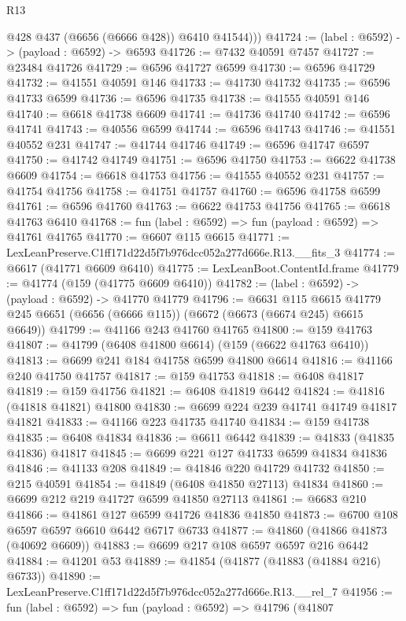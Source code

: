 \begin{lexlean}{R13}
\begin{coremodule}
          @428
          @437
          (@6656 (@6666 @428))
          @6410
          @41544)))
@41724 := (label : @6592) -> (payload : @6592) -> @6593
@41726 := @7432 @40591 @7457
@41727 := @23484 @41726
@41729 := @6596 @41727 @6599
@41730 := @6596 @41729
@41732 := @41551 @40591 @146
@41733 := @41730 @41732
@41735 := @6596 @41733 @6599
@41736 := @6596 @41735
@41738 := @41555 @40591 @146
@41740 := @6618 @41738 @6609
@41741 := @41736 @41740
@41742 := @6596 @41741
@41743 := @40556 @6599
@41744 := @6596 @41743
@41746 := @41551 @40552 @231
@41747 := @41744 @41746
@41749 := @6596 @41747 @6597
@41750 := @41742 @41749
@41751 := @6596 @41750
@41753 := @6622 @41738 @6609
@41754 := @6618 @41753
@41756 := @41555 @40552 @231
@41757 := @41754 @41756
@41758 := @41751 @41757
@41760 := @6596 @41758 @6599
@41761 := @6596 @41760
@41763 := @6622 @41753 @41756
@41765 := @6618 @41763 @6410
@41768 := fun (label : @6592) => fun (payload : @6592) => @41761 @41765
@41770 := @6607 @115 @6615
@41771 := LexLeanPreserve.C1ff171d22d5f7b976dcc052a277d666e.R13.__fits_3
@41774 := @6617 (@41771 @6609 @6410)
@41775 := LexLeanBoot.ContentId.frame
@41779 := @41774 (@159 (@41775 @6609 @6410))
@41782 := (label : @6592) -> (payload : @6592) -> @41770 @41779
@41796 := @6631
    @115
    @6615
    @41779
    @245
    @6651
    (@6656 (@6666 @115))
    (@6672 (@6673 (@6674 @245) @6615 @6649))
@41799 := @41166 @243 @41760 @41765
@41800 := @159 @41763
@41807 := @41799 (@6408 @41800 @6614) (@159 (@6622 @41763 @6410))
@41813 := @6699 @241 @184 @41758 @6599 @41800 @6614
@41816 := @41166 @240 @41750 @41757
@41817 := @159 @41753
@41818 := @6408 @41817
@41819 := @159 @41756
@41821 := @6408 @41819 @6442
@41824 := @41816 (@41818 @41821) @41800
@41830 := @6699 @224 @239 @41741 @41749 @41817 @41821
@41833 := @41166 @223 @41735 @41740
@41834 := @159 @41738
@41835 := @6408 @41834
@41836 := @6611 @6442
@41839 := @41833 (@41835 @41836) @41817
@41845 := @6699 @221 @127 @41733 @6599 @41834 @41836
@41846 := @41133 @208
@41849 := @41846 @220 @41729 @41732
@41850 := @215 @40591
@41854 := @41849 (@6408 @41850 @27113) @41834
@41860 := @6699 @212 @219 @41727 @6599 @41850 @27113
@41861 := @6683 @210
@41866 := @41861 @127 @6599 @41726 @41836 @41850
@41873 := @6700 @108 @6597 @6597 @6610 @6442 @6717 @6733
@41877 := @41860 (@41866 @41873 (@40692 @6609))
@41883 := @6699 @217 @108 @6597 @6597 @216 @6442
@41884 := @41201 @53
@41889 := @41854 (@41877 (@41883 (@41884 @216) @6733))
@41890 := LexLeanPreserve.C1ff171d22d5f7b976dcc052a277d666e.R13.__rel_7
@41956 := fun (label : @6592) =>
  fun (payload : @6592) =>
  @41796
    (@41807

\end{coremodule}
\end{lexlean}
